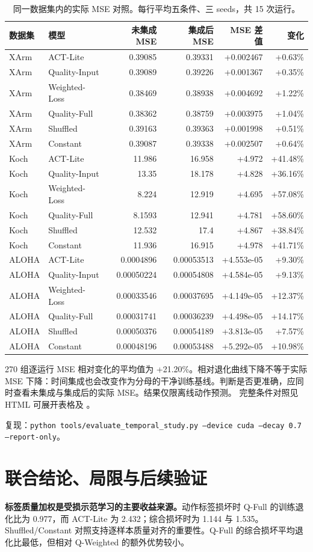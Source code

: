 \documentclass[11pt,a4paper,fontset=fandol]{ctexart}
\newcommand{\code}[1]{\texttt{\small #1}}
\begin{document}
\begin{table}[H]\centering\small\begin{tabularx}{\linewidth}{lYrrrr}\toprule
数据集 & 模型 & 未集成 MSE & 集成后 MSE & MSE 差值 & 变化\\\midrule
XArm & ACT-Lite & 0.39085 & 0.39331 & +0.002467 & +0.63\%\\
XArm & Quality-Input & 0.39089 & 0.39226 & +0.001367 & +0.35\%\\
XArm & Weighted-Loss & 0.38469 & 0.38938 & +0.004692 & +1.22\%\\
XArm & Quality-Full & 0.38362 & 0.38759 & +0.003975 & +1.04\%\\
XArm & Shuffled & 0.39163 & 0.39363 & +0.001998 & +0.51\%\\
XArm & Constant & 0.39087 & 0.39338 & +0.002507 & +0.64\%\\
Koch & ACT-Lite & 11.986 & 16.958 & +4.972 & +41.48\%\\
Koch & Quality-Input & 13.35 & 18.178 & +4.828 & +36.16\%\\
Koch & Weighted-Loss & 8.224 & 12.919 & +4.695 & +57.08\%\\
Koch & Quality-Full & 8.1593 & 12.941 & +4.781 & +58.60\%\\
Koch & Shuffled & 12.532 & 17.4 & +4.867 & +38.84\%\\
Koch & Constant & 11.936 & 16.915 & +4.978 & +41.71\%\\
ALOHA & ACT-Lite & 0.0004896 & 0.00053513 & +4.553e-05 & +9.30\%\\
ALOHA & Quality-Input & 0.00050224 & 0.00054808 & +4.584e-05 & +9.13\%\\
ALOHA & Weighted-Loss & 0.00033546 & 0.00037695 & +4.149e-05 & +12.37\%\\
ALOHA & Quality-Full & 0.00031741 & 0.00036239 & +4.498e-05 & +14.17\%\\
ALOHA & Shuffled & 0.00050376 & 0.00054189 & +3.813e-05 & +7.57\%\\
ALOHA & Constant & 0.00048196 & 0.00053488 & +5.292e-05 & +10.98\%\\
\bottomrule\end{tabularx}\caption{同一数据集内的实际 MSE 对照。每行平均五条件、三 seeds，共 15 次运行。}\end{table}
270 组逐运行 MSE 相对变化的平均值为 +21.20\%。相对退化曲线下降不等于实际 MSE 下降：时间集成也会改变作为分母的干净训练基线。判断是否更准确，应同时查看未集成与集成后的实际 MSE。结果仅限离线动作预测。
\noindent 完整条件对照见 HTML 可展开表格及 。
\par\noindent 复现：\code{python tools/evaluate\_temporal\_study.py --device cuda --decay 0.7 --report-only}。
\par\endgroup
\clearpage\section{联合结论、局限与后续验证}
\textbf{标签质量加权是受损示范学习的主要收益来源。}动作标签损坏时 Q-Full 的训练退化比为 0.977，而 ACT-Lite 为 2.432；综合损坏时为 1.144 与 1.535。Shuffled/Constant 对照支持逐样本质量对齐的重要性。Q-Full 的综合损坏平均退化比最低，但相对 Q-Weighted 的额外优势较小。
\end{document}
